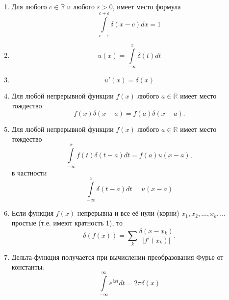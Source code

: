 \begin{prop}
\begin{enumerate}
	\item  Для любого $c \in \mathbb{R}$ и любого $\varepsilon > 0$, имеет место формула
\begin{equation*}
	\int\limits_{c-\varepsilon}^{c+\varepsilon}\delta(x-c)dx=1
\end{equation*}
	\item 
	\begin{equation*}
		u(x)=\int\limits_{-\infty}^x\delta(t)dt
	\end{equation*}
	\item 
	\begin{equation*}
		u'(x)=\delta(x)
	\end{equation*}
	\item Для любой непрерывной функции $f(x)$ любого $a \in \mathbb{R}$ имеет место тождество
	\begin{equation}
		f(x)\delta(x-a)=f(a)\delta(x-a).
	\end{equation}
	\item Для любой непрерывной функции $f(x)$ любого $a \in \mathbb{R}$ имеет место тождество
	\begin{equation}
		\int\limits_{-\infty}^xf(t)\delta(t-a)dt=f(a)u(x-a),
	\end{equation}
	в частности
	\begin{equation}
		\int\limits_{-\infty}^x\delta(t-a)dt=u(x-a)
	\end{equation}
	\item Если функция $f(x)$ непрерывна и все её нули (корни) $x_1, x_2,\dots , x_k, \dots$ простые (т.е. имеют кратность 1), то
	\begin{equation}
		\delta(f(x))=\sum\limits_k\frac{\delta(x-x_k)}{|f'(x_k)|}.
	\end{equation}
	\item Дельта-функция получается при вычислении преобразования Фурье
	от константы:
	\begin{equation}
		\int\limits_{-\infty}^{\infty}e^{ixt}dt=2\pi \delta(x)
	\end{equation}
\end{enumerate}
\end{prop}

